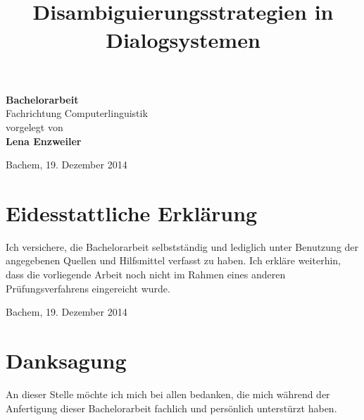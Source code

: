 \documentclass[12pt,a4paper]{scrartcl}
\title{$\,$\\  Disambiguierungsstrategien in Dialogsystemen}
\date{}
\author{}
\begin{document}


\maketitle
\sffamily
\begin{center}
\huge
\textbf{Bachelorarbeit}\\
\vfill
\LARGE
Fachrichtung Computerlinguistik\\
\vfill
\normalsize
vorgelegt von\\
\Large
\textbf{Lena Enzweiler}\\
\vfill


\normalsize
Bachem, 19. Dezember 2014

\end{center}

\thispagestyle{empty}
\rmfamily
\cleardoublepage


\section*{Eidesstattliche Erklärung}

Ich versichere, die Bachelorarbeit selbstständig und lediglich unter Benutzung der angegebenen Quellen und Hilfsmittel verfasst zu haben.
\newline
\newline
Ich erkläre weiterhin, dass die vorliegende Arbeit noch nicht im Rahmen eines anderen Prüfungsverfahrens eingereicht wurde.
\newline
\newline

Bachem, 19. Dezember 2014
\newpage

\section*{Danksagung}
An dieser Stelle möchte ich mich bei allen bedanken, die mich während der Anfertigung dieser Bachelorarbeit fachlich und persönlich unterstürzt haben.\\
\end{document}
